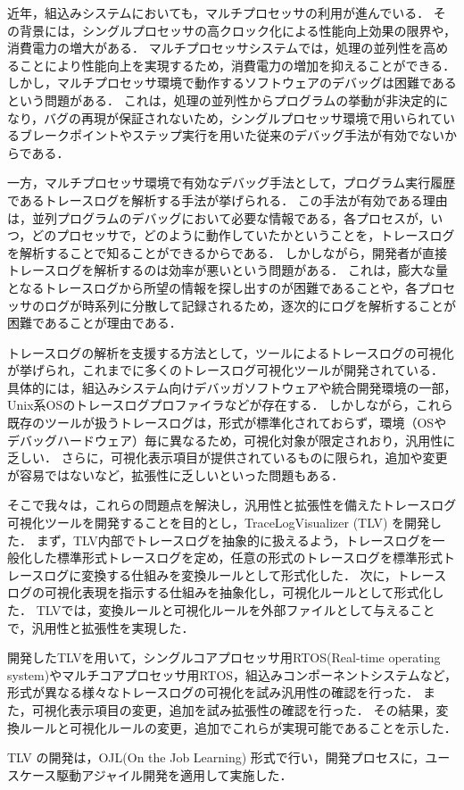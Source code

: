 近年，組込みシステムにおいても，マルチプロセッサの利用が進んでいる．
その背景には，シングルプロセッサの高クロック化による性能向上効果の限界や，消費電力の増大がある．
マルチプロセッサシステムでは，処理の並列性を高めることにより性能向上を実現するため，消費電力の増加を抑えることができる．
しかし，マルチプロセッサ環境で動作するソフトウェアのデバッグは困難であるという問題がある．
これは，処理の並列性からプログラムの挙動が非決定的になり，バグの再現が保証されないため，シングルプロセッサ環境で用いられているブレークポイントやステップ実行を用いた従来のデバッグ手法が有効でないからである．

一方，マルチプロセッサ環境で有効なデバッグ手法として，プログラム実行履歴であるトレースログを解析する手法が挙げられる．
この手法が有効である理由は，並列プログラムのデバッグにおいて必要な情報である，各プロセスが，いつ，どのプロセッサで，どのように動作していたかということを，トレースログを解析することで知ることができるからである．
しかしながら，開発者が直接トレースログを解析するのは効率が悪いという問題がある．
これは，膨大な量となるトレースログから所望の情報を探し出すのが困難であることや，各プロセッサのログが時系列に分散して記録されるため，逐次的にログを解析することが困難であることが理由である．

トレースログの解析を支援する方法として，ツールによるトレースログの可視化が挙げられ，これまでに多くのトレースログ可視化ツールが開発されている．
具体的には，組込みシステム向けデバッガソフトウェアや統合開発環境の一部，Unix系OSのトレースログプロファイラなどが存在する．
しかしながら，これら既存のツールが扱うトレースログは，形式が標準化されておらず，環境（OSやデバッグハードウェア）毎に異なるため，可視化対象が限定されおり，汎用性に乏しい．
さらに，可視化表示項目が提供されているものに限られ，追加や変更が容易ではないなど，拡張性に乏しいといった問題もある．

そこで我々は，これらの問題点を解決し，汎用性と拡張性を備えたトレースログ可視化ツールを開発することを目的とし，TraceLogVisualizer (TLV) を開発した．
まず，TLV内部でトレースログを抽象的に扱えるよう，トレースログを一般化した標準形式トレースログを定め，任意の形式のトレースログを標準形式トレースログに変換する仕組みを変換ルールとして形式化した．
次に，トレースログの可視化表現を指示する仕組みを抽象化し，可視化ルールとして形式化した．
TLVでは，変換ルールと可視化ルールを外部ファイルとして与えることで，汎用性と拡張性を実現した．

開発したTLVを用いて，シングルコアプロセッサ用RTOS(Real-time operating system)やマルチコアプロセッサ用RTOS，組込みコンポーネントシステムなど，形式が異なる様々なトレースログの可視化を試み汎用性の確認を行った．
また，可視化表示項目の変更，追加を試み拡張性の確認を行った．
その結果，変換ルールと可視化ルールの変更，追加でこれらが実現可能であることを示した．

TLV の開発は，OJL(On the Job Learning) 形式で行い，開発プロセスに，ユースケース駆動アジャイル開発を適用して実施した．

